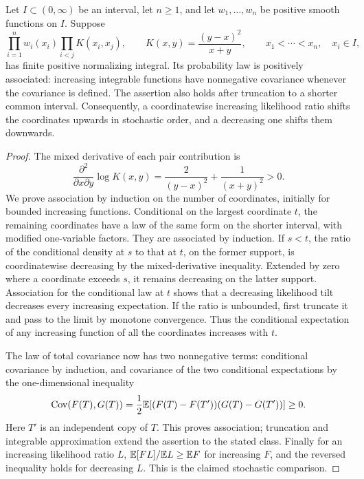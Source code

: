 \begin{lemma}\label{lem:association}
Let $I\subset(0,\infty)$ be an interval, let $n\ge1$, and let
$w_1,\ldots,w_n$ be positive smooth functions on $I$. Suppose
\[
 \prod_{i=1}^n w_i(x_i)\prod_{i<j}K(x_i,x_j),\qquad
 K(x,y)=\frac{(y-x)^2}{x+y},\qquad x_1<\cdots<x_n,\quad x_i\in I,
\]
has finite positive normalizing integral. Its probability law is
positively associated: increasing integrable functions have nonnegative
covariance whenever the covariance is defined. The assertion also
holds after truncation to a shorter common interval. Consequently,
a coordinatewise increasing likelihood ratio shifts the coordinates
upwards in stochastic order, and a decreasing one shifts them
downwards.
\end{lemma}

\begin{proof}
The mixed derivative of each pair contribution is
\[
 \frac{\partial^2}{\partial x\partial y}\log K(x,y)
 =\frac2{(y-x)^2}+\frac1{(x+y)^2}>0.
\]
We prove association by induction on the number of coordinates,
initially for bounded increasing functions. Conditional on the
largest coordinate $t$, the remaining coordinates have a law of the
same form on the shorter interval, with modified one-variable
factors. They are associated by induction. If $s<t$, the ratio of
the conditional density at $s$ to that at $t$, on the former support,
is coordinatewise decreasing by the mixed-derivative inequality.
Extended by zero where a coordinate exceeds $s$, it remains
decreasing on the latter support. Association for the conditional
law at $t$ shows that a decreasing likelihood tilt decreases every
increasing expectation. If the ratio is unbounded, first truncate
it and pass to the limit by monotone convergence. Thus the
conditional expectation of any increasing function of all the
coordinates increases with $t$.

The law of total covariance now has two nonnegative terms:
conditional covariance by induction, and covariance of the two
conditional expectations by the one-dimensional inequality
\[
 \operatorname{Cov}(F(T),G(T))
 =\frac12\mathbb E[(F(T)-F(T'))(G(T)-G(T'))]\ge0.
\]
Here $T'$ is an independent copy of $T$. This proves association;
truncation and integrable approximation extend the assertion to the
stated class. Finally for an increasing likelihood ratio $L$,
$\mathbb E[FL]/\mathbb E L\ge\mathbb E F$ for increasing $F$, and the reversed inequality
holds for decreasing $L$. This is the claimed stochastic comparison.
\end{proof}

